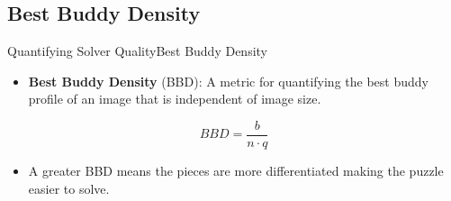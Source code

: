 \documentclass[10pt]{beamer}
\begin{document}
\subsection{Best Buddy Density}
\begin{frame}{Quantifying Solver Quality}{Best Buddy Density}
  \begin{itemize}
    \setlength\itemsep{1em}
    \item \textbf{Best Buddy Density} (BBD): A metric for quantifying the best buddy profile of an image that is independent of image size.
  \end{itemize}
  \vfill
  \begin{equation} \label{eq:bestBuddyDensity}
    BBD = \frac{b}{n \cdot q}
  \end{equation}
  \vspace{-0.6em}
  \begin{itemize}
    \vfill
    \item A greater BBD means the pieces are more differentiated making the puzzle easier to solve.
  \end{itemize}
\end{frame}
\end{document}

